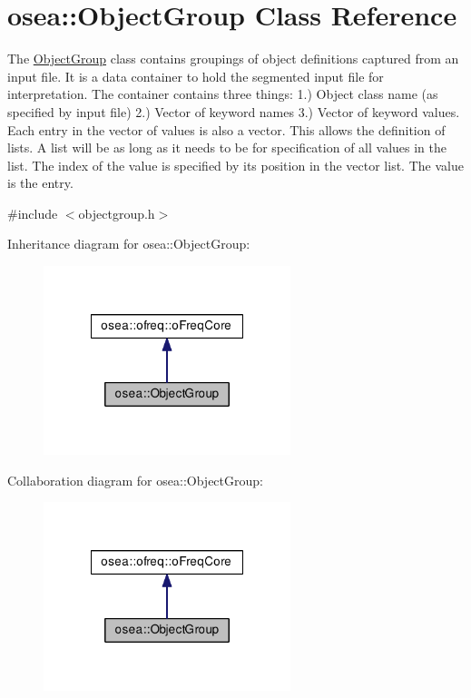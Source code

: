 \hypertarget{classosea_1_1_object_group}{\section{osea\-:\-:Object\-Group Class Reference}
\label{classosea_1_1_object_group}
}


The \hyperlink{classosea_1_1_object_group}{Object\-Group} class contains groupings of object definitions captured from an input file. It is a data container to hold the segmented input file for interpretation. The container contains three things\-: 1.) Object class name (as specified by input file) 2.) Vector of keyword names 3.) Vector of keyword values. Each entry in the vector of values is also a vector. This allows the definition of lists. A list will be as long as it needs to be for specification of all values in the list. The index of the value is specified by its position in the vector list. The value is the entry.  




{\ttfamily \#include $<$objectgroup.\-h$>$}



Inheritance diagram for osea\-:\-:Object\-Group\-:\nopagebreak
\begin{figure}[H]
\begin{center}
\leavevmode
\includegraphics[width=204pt]{classosea_1_1_object_group__inherit__graph}
\end{center}
\end{figure}


Collaboration diagram for osea\-:\-:Object\-Group\-:\nopagebreak
\begin{figure}[H]
\begin{center}
\leavevmode
\includegraphics[width=204pt]{classosea_1_1_object_group__coll__graph}
\end{center}
\end{figure}

